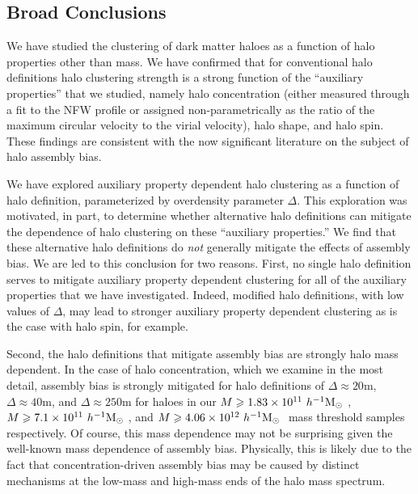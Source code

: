 \documentclass[usenatbib,fleqn]{mnras}
\begin{document}
\subsection{Broad Conclusions}

We have studied the clustering of dark matter haloes as a function of halo properties other than mass. We have confirmed that for conventional halo definitions halo clustering strength is a strong function of the  ``auxiliary properties'' that we studied, namely halo concentration (either measured through a fit to the NFW profile or assigned non-parametrically as the ratio of the maximum circular velocity to the virial velocity), halo shape, and halo spin. These findings are consistent with the now significant literature on the subject of halo assembly bias. \citep{peacock_smith00, wechsler_etal02,sheth_tormen04, gao_etal05, zentner_etal05, allgood_etal06, harker_etal06, wechsler_etal06, croton_etal07, zentner07, dalal_etal08, lacerna_padilla12, zentner_etal14, mao_etal15, sunayama_etal16}

We have explored auxiliary property dependent halo clustering as a function of halo definition, parameterized by overdensity parameter $\Delta$. This exploration was motivated, in part, to determine whether alternative halo definitions can mitigate the dependence of halo clustering on these ``auxiliary properties.'' We find that these alternative halo definitions do {\em not} generally mitigate the effects of assembly bias. We are led to this conclusion for two reasons. First, no single halo definition serves to mitigate auxiliary property dependent clustering for all of the auxiliary properties that we have investigated. Indeed, modified halo definitions, with low values of $\Delta$, may lead to stronger auxiliary property dependent clustering as is the case with halo spin, for example.

Second, the halo definitions that mitigate assembly bias are strongly halo mass dependent. In the case of halo concentration, which we examine in the most detail, assembly bias is strongly mitigated for halo definitions of $\Delta \approx 20$m, $\Delta \approx 40$m, and $\Delta \approx 250$m for haloes in our $M \geqslant 1.83 \times 10^{11} \ h^{-1}\mathrm{M}_{\odot}~$, $M \geqslant 7.1 \times 10^{11} \ h^{-1}\mathrm{M}_{\odot}~$, and $M \geqslant 4.06 \times 10^{12} \ h^{-1}\mathrm{M}_{\odot}~$ mass threshold samples respectively. Of course, this mass dependence may not be surprising given the well-known mass dependence of assembly bias. Physically, this is likely due to the fact that concentration-driven assembly bias may be caused by distinct mechanisms at the low-mass 
\citep[e.g., see][]{wang_etal07,dalal_etal08,warnick_etal08,hahn_etal09,ludlow_etal09,sunayama_etal16} and high-mass \citep[e.g.,][]{zentner07,dalal_etal08} ends of the halo mass spectrum. 
\end{document}

